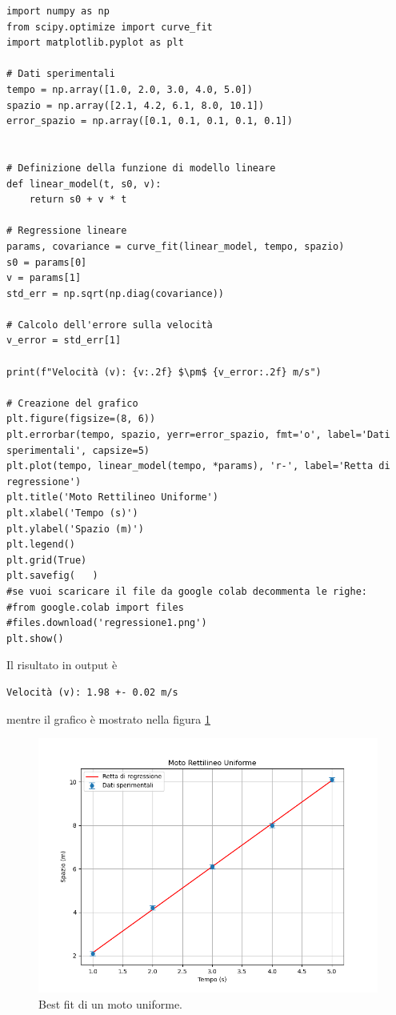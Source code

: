 \documentclass[a4paper,12pt]{article}
\begin{document}
\begin{lstlisting}[caption={Script Python per eseguire la regressione lineare}]
import numpy as np
from scipy.optimize import curve_fit
import matplotlib.pyplot as plt

# Dati sperimentali
tempo = np.array([1.0, 2.0, 3.0, 4.0, 5.0])
spazio = np.array([2.1, 4.2, 6.1, 8.0, 10.1])
error_spazio = np.array([0.1, 0.1, 0.1, 0.1, 0.1])  


# Definizione della funzione di modello lineare
def linear_model(t, s0, v):
    return s0 + v * t

# Regressione lineare
params, covariance = curve_fit(linear_model, tempo, spazio)
s0 = params[0]
v = params[1]
std_err = np.sqrt(np.diag(covariance))

# Calcolo dell'errore sulla velocità
v_error = std_err[1]

print(f"Velocità (v): {v:.2f} $\pm$ {v_error:.2f} m/s")

# Creazione del grafico
plt.figure(figsize=(8, 6))
plt.errorbar(tempo, spazio, yerr=error_spazio, fmt='o', label='Dati sperimentali', capsize=5)
plt.plot(tempo, linear_model(tempo, *params), 'r-', label='Retta di regressione')
plt.title('Moto Rettilineo Uniforme')
plt.xlabel('Tempo (s)')
plt.ylabel('Spazio (m)')
plt.legend()
plt.grid(True)
plt.savefig(   )
#se vuoi scaricare il file da google colab decommenta le righe:
#from google.colab import files
#files.download('regressione1.png')
plt.show()
\end{lstlisting}
Il risultato in output è
\begin{verbatim}
Velocità (v): 1.98 +- 0.02 m/s
\end{verbatim}
mentre il grafico è mostrato nella figura \ref{fig:vel}
 \begin{figure}[h!]
    \centering
    \includegraphics[scale=0.7]{velocita.png} 
    \caption{Best fit di un moto uniforme.}
    \label{fig:vel}
\end{figure}
\end{document}
